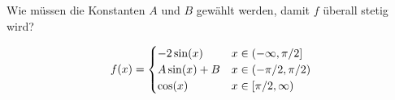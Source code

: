 \item Wie müssen die Konstanten $A$ und $B$ gewählt werden, damit $f$ überall stetig wird?

$$
  f(x) = \begin{cases}-2\sin(x) & x\in (-\infty,\-\pi/2] \\ A\sin(x)+B & x \in (-\pi/2,\pi/2) \\ \cos(x) & x \in [\pi/2,\infty) \end{cases}
$$